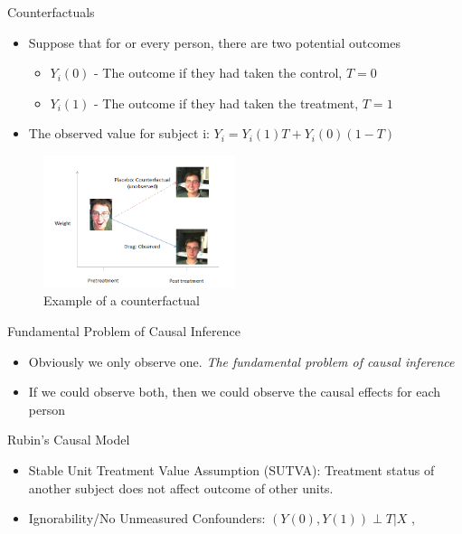 \begin{frame}{Counterfactuals}
\begin{itemize}
 \item Suppose that for or every person, there are two potential outcomes
 \begin{itemize}
  \item $Y_i(0)$ - The outcome if they had taken the control, $T=0$
  \item $Y_i(1)$ - The outcome if they had taken the treatment, $T=1$
 \end{itemize}
 \item The observed value for subject i: $Y_i=Y_i(1)T+Y_i(0)(1-T)$
  \end{itemize}
     \begin{figure}[h!]
  \centering
    \includegraphics[width=0.5\textwidth]{counterfactual.png}
    \caption{Example of a counterfactual}
\label{fig:counterfactual}
\end{figure}
\end{frame}




  
\begin{frame}{Fundamental Problem of Causal Inference}

\begin{itemize}
 \item Obviously we only observe one. \textit{The fundamental problem of causal inference}
\item If we could observe both, then we could observe the causal effects for each person
\end{itemize}
\end{frame}


\begin{frame}{Rubin's Causal Model}
\begin{itemize}
\item Stable Unit Treatment Value Assumption (SUTVA): Treatment status of another subject does 
not affect outcome of other units. 
\item Ignorability/No Unmeasured Confounders: $(Y(0),Y(1))\perp T|X$ ,\cite{Rosenbaum1983}
\end{itemize}
\end{frame}




